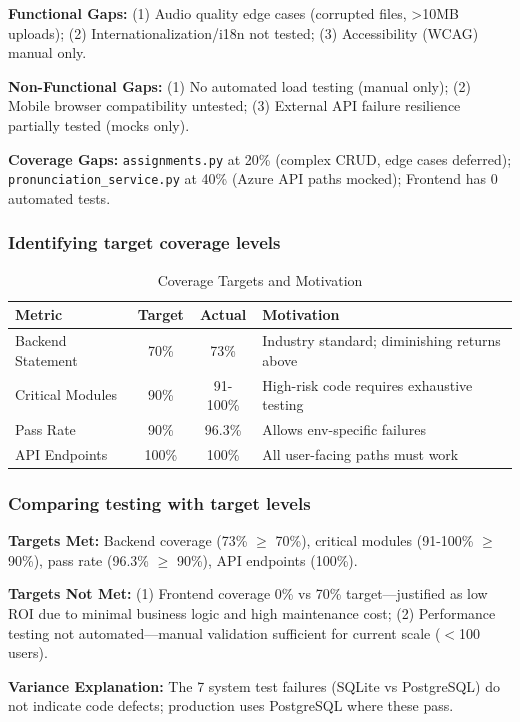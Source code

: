 \documentclass[sigconf]{acmart}
\begin{document}
\textbf{Functional Gaps:} (1) Audio quality edge cases (corrupted files, >10MB uploads); (2) Internationalization/i18n not tested; (3) Accessibility (WCAG) manual only.

\textbf{Non-Functional Gaps:} (1) No automated load testing (manual only); (2) Mobile browser compatibility untested; (3) External API failure resilience partially tested (mocks only).

\textbf{Coverage Gaps:} \texttt{assignments.py} at 20\% (complex CRUD, edge cases deferred); \texttt{pronunciation\_service.py} at 40\% (Azure API paths mocked); Frontend has 0 automated tests.

\subsubsection{Identifying target coverage levels}

\begin{table}[h]
\small
\caption{Coverage Targets and Motivation}
\begin{tabular}{lccp{4cm}}
\toprule
\textbf{Metric} & \textbf{Target} & \textbf{Actual} & \textbf{Motivation} \\
\midrule
Backend Statement & 70\% & 73\% & Industry standard; diminishing returns above \\
Critical Modules & 90\% & 91-100\% & High-risk code requires exhaustive testing \\
Pass Rate & 90\% & 96.3\% & Allows env-specific failures \\
API Endpoints & 100\% & 100\% & All user-facing paths must work \\
\bottomrule
\end{tabular}
\end{table}

\subsubsection{Comparing testing with target levels}

\textbf{Targets Met:} Backend coverage (73\% $\geq$ 70\%), critical modules (91-100\% $\geq$ 90\%), pass rate (96.3\% $\geq$ 90\%), API endpoints (100\%).

\textbf{Targets Not Met:} (1) Frontend coverage 0\% vs 70\% target---justified as low ROI due to minimal business logic and high maintenance cost; (2) Performance testing not automated---manual validation sufficient for current scale ($<$100 users).

\textbf{Variance Explanation:} The 7 system test failures (SQLite vs PostgreSQL) do not indicate code defects; production uses PostgreSQL where these pass.
\end{document}
